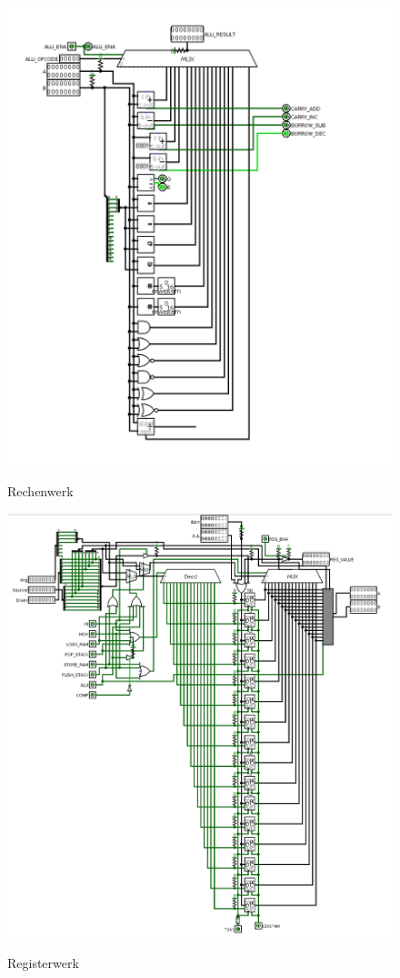 \documentclass[12pt]{article}
\begin{document}
\begin{figure}[!htbp]
\includegraphics[scale=0.35]{alu}
\centering
\label{fig:alu}
\caption{Rechenwerk}
\end{figure}

\newpage

\begin{figure}[!htbp]
\includegraphics[scale=0.35]{register}
\centering
\label{fig:register}
\caption{Registerwerk}
\end{figure}
\end{document}
